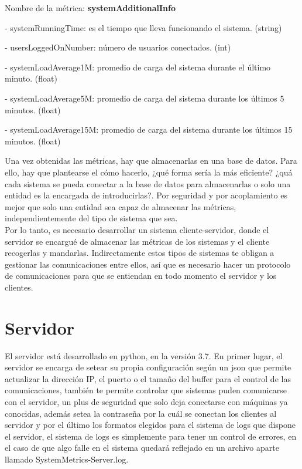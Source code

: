 \documentclass[ spanish, a4paper, 12pt, oneside]{report}
\begin{document}
Nombre de la métrica: \textbf{systemAdditionalInfo}

\hyp{} systemRunningTime: es el tiempo que lleva funcionando el sistema. (string)

\hyp{} usersLoggedOnNumber: número de usuarios conectados. (int)

\hyp{} systemLoadAverage1M: promedio de carga del sistema durante el último minuto. (float)

\hyp{} systemLoadAverage5M: promedio de carga del sistema durante los últimos 5 minutos. (float)

\hyp{} systemLoadAverage15M: promedio de carga del sistema durante los últimos 15 minutos. (float)

Una vez obtenidas las métricas, hay que almacenarlas en una base de datos. Para ello, hay que plantearse el cómo hacerlo, ¿qué forma 
sería la más eficiente? ¿quá cada sistema se pueda conectar a la base de datos para almacenarlas o solo una entidad es la encargada 
de introducirlas?. Por seguridad y por acoplamiento es mejor que solo una entidad sea capaz de almacenar las métricas, independientemente 
del tipo de sistema que sea.\\

Por lo tanto, es necesario desarrollar un sistema cliente-servidor, donde el servidor se encargué de almacenar las métricas de los sistemas 
y el cliente recogerlas y mandarlas. Indirectamente estos tipos de sistemas te obligan a gestionar las comunicaciones entre ellos, así que es necesario 
hacer un protocolo de comunicaciones para que se entiendan en todo momento el servidor y los clientes.\\

\section{Servidor}

El servidor está desarrollado en python, en la versión 3.7. En primer lugar, el servidor se encarga de setear su propia configuración según un json 
que permite actualizar la dirección IP, el puerto o el tamaño del buffer para el control de las comunicaciones, también te permite controlar que sistemas puden 
comunicarse con el servidor, un plus de seguridad que solo deja conectarse con máquinas ya conocidas, además setea la contraseña por la cuál se conectan los clientes 
al servidor y por el último los formatos elegidos para el sistema de logs que dispone el servidor, el sistema de logs es simplemente para tener un control de errores, 
en el caso de que algo falle en el sistema quedará reflejado en un archivo aparte llamado SystemMetrics-Server.log.\\
\end{document}
